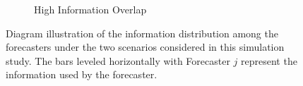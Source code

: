 \documentclass[11pt]{article}
\theoremstyle{definition}
\theoremstyle{definition}
\begin{document}
\begin{figure}[t!]
\begin{subfigure}[b]{0.49\textwidth}
                \caption{High Information Overlap}
                \label{DiagramsB}
        \end{subfigure}
   \caption{Diagram illustration of the information distribution among the forecasters under the two scenarios considered in this simulation study.  The bars leveled horizontally with Forecaster $j$ represent the information used by the forecaster.}    
        \label{Diagrams}
\end{figure}

\end{document}
